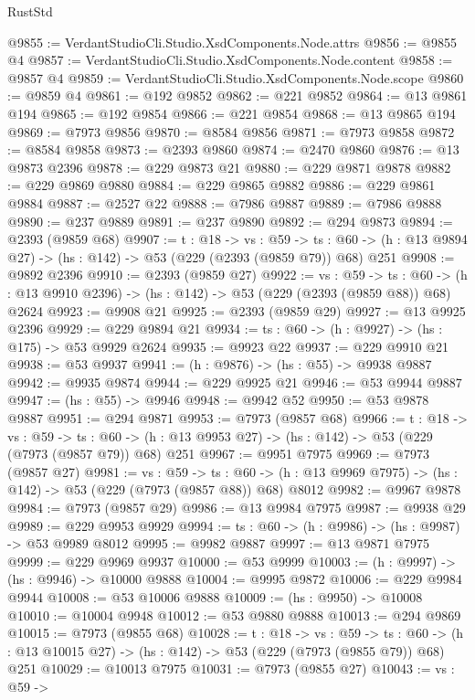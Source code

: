 \begin{lexlean}{RustStd}
\begin{coremodule}
@9855 := VerdantStudioCli.Studio.XsdComponents.Node.attrs
@9856 := @9855 @4
@9857 := VerdantStudioCli.Studio.XsdComponents.Node.content
@9858 := @9857 @4
@9859 := VerdantStudioCli.Studio.XsdComponents.Node.scope
@9860 := @9859 @4
@9861 := @192 @9852
@9862 := @221 @9852
@9864 := @13 @9861 @194
@9865 := @192 @9854
@9866 := @221 @9854
@9868 := @13 @9865 @194
@9869 := @7973 @9856
@9870 := @8584 @9856
@9871 := @7973 @9858
@9872 := @8584 @9858
@9873 := @2393 @9860
@9874 := @2470 @9860
@9876 := @13 @9873 @2396
@9878 := @229 @9873 @21
@9880 := @229 @9871 @9878
@9882 := @229 @9869 @9880
@9884 := @229 @9865 @9882
@9886 := @229 @9861 @9884
@9887 := @2527 @22
@9888 := @7986 @9887
@9889 := @7986 @9888
@9890 := @237 @9889
@9891 := @237 @9890
@9892 := @294 @9873
@9894 := @2393 (@9859 @68)
@9907 := {t : @18} ->
  {vs : @59} ->
  {ts : @60} -> (h : @13 @9894 @27) -> (hs : @142) -> @53 (@229 (@2393 (@9859 @79)) @68) @251
@9908 := @9892 @2396
@9910 := @2393 (@9859 @27)
@9922 := {vs : @59} ->
  {ts : @60} -> (h : @13 @9910 @2396) -> (hs : @142) -> @53 (@229 (@2393 (@9859 @88)) @68) @2624
@9923 := @9908 @21
@9925 := @2393 (@9859 @29)
@9927 := @13 @9925 @2396
@9929 := @229 @9894 @21
@9934 := {ts : @60} -> (h : @9927) -> (hs : @175) -> @53 @9929 @2624
@9935 := @9923 @22
@9937 := @229 @9910 @21
@9938 := @53 @9937
@9941 := (h : @9876) -> (hs : @55) -> @9938 @9887
@9942 := @9935 @9874
@9944 := @229 @9925 @21
@9946 := @53 @9944 @9887
@9947 := (hs : @55) -> @9946
@9948 := @9942 @52
@9950 := @53 @9878 @9887
@9951 := @294 @9871
@9953 := @7973 (@9857 @68)
@9966 := {t : @18} ->
  {vs : @59} ->
  {ts : @60} -> (h : @13 @9953 @27) -> (hs : @142) -> @53 (@229 (@7973 (@9857 @79)) @68) @251
@9967 := @9951 @7975
@9969 := @7973 (@9857 @27)
@9981 := {vs : @59} ->
  {ts : @60} -> (h : @13 @9969 @7975) -> (hs : @142) -> @53 (@229 (@7973 (@9857 @88)) @68) @8012
@9982 := @9967 @9878
@9984 := @7973 (@9857 @29)
@9986 := @13 @9984 @7975
@9987 := @9938 @29
@9989 := @229 @9953 @9929
@9994 := {ts : @60} -> (h : @9986) -> (hs : @9987) -> @53 @9989 @8012
@9995 := @9982 @9887
@9997 := @13 @9871 @7975
@9999 := @229 @9969 @9937
@10000 := @53 @9999
@10003 := (h : @9997) -> (hs : @9946) -> @10000 @9888
@10004 := @9995 @9872
@10006 := @229 @9984 @9944
@10008 := @53 @10006 @9888
@10009 := (hs : @9950) -> @10008
@10010 := @10004 @9948
@10012 := @53 @9880 @9888
@10013 := @294 @9869
@10015 := @7973 (@9855 @68)
@10028 := {t : @18} ->
  {vs : @59} ->
  {ts : @60} -> (h : @13 @10015 @27) -> (hs : @142) -> @53 (@229 (@7973 (@9855 @79)) @68) @251
@10029 := @10013 @7975
@10031 := @7973 (@9855 @27)
@10043 := {vs : @59} ->

\end{coremodule}
\end{lexlean}
